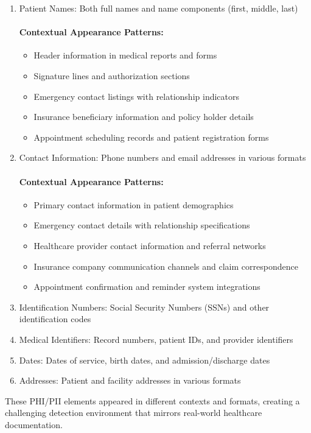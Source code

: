 \documentclass[conference]{IEEEtran}
\begin{document}
\begin{enumerate}
\item Patient Names: Both full names and name components (first, middle, last)
\paragraph{Contextual Appearance Patterns:}
\begin{itemize}
\item Header information in medical reports and forms
\item Signature lines and authorization sections
\item Emergency contact listings with relationship indicators
\item Insurance beneficiary information and policy holder details
\item Appointment scheduling records and patient registration forms
\end{itemize}

\item Contact Information: Phone numbers and email addresses in various formats
\paragraph{Contextual Appearance Patterns:}
\begin{itemize}
\item Primary contact information in patient demographics
\item Emergency contact details with relationship specifications
\item Healthcare provider contact information and referral networks
\item Insurance company communication channels and claim correspondence
\item Appointment confirmation and reminder system integrations
\end{itemize}
\item Identification Numbers: Social Security Numbers (SSNs) and other identification codes
\item Medical Identifiers: Record numbers, patient IDs, and provider identifiers
\item Dates: Dates of service, birth dates, and admission/discharge dates
\item Addresses: Patient and facility addresses in various formats
\end{enumerate}
These PHI/PII elements appeared in different contexts and formats, creating a challenging detection environment that mirrors real-world healthcare documentation.
\end{document}
